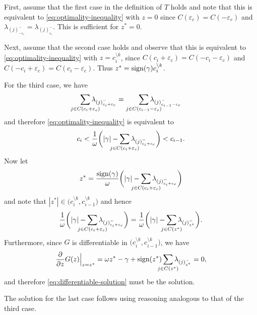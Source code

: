 First, assume that the first case in the definition of \(T\) holds
and note that this is equivalent to \eqref{eq:optimality-inequality} with \(z
= 0\) since \(C({\varepsilon_c}) = C(-{\varepsilon_c})\) and
\(\lambda_{(j)^-_{-{\varepsilon_c}}} = \lambda_{(j)^-_{{\varepsilon_c}}}\).
This is sufficient for \(z^* = 0\).

Next, assume that the second case holds and observe that this is equivalent
to \eqref{eq:optimality-inequality} with
\(z = c_i^{\setminus k}\), since
\(C(c_i + {\varepsilon_c}) = C(-c_i - {\varepsilon_c})\) and
\(C(-c_i + {\varepsilon_c}) = C(c_i - {\varepsilon_c})\). Thus \(z^* =
\operatorname{sign}(\gamma)c_i^{\setminus k}\).

For the third case, we have
\[
  \smashoperator{\sum_{j \in C(c_i + {\varepsilon_c})}} \lambda_{(j)^-_{c_i + {\varepsilon_c}}}
  =
  \smashoperator[r]{\sum_{j \in C(c_{i-1} - {\varepsilon_c})}} \lambda_{(j)^-_{c_{i-1} - {\varepsilon_c}}}
\]
and therefore \eqref{eq:optimality-inequality} is equivalent to
\[
  c_i < \frac{1}{\omega} \bigg( |\gamma| - \smashoperator{\sum_{j \in C(c_i + {\varepsilon_c})}} \lambda_{(j)^-_{c_i + {\varepsilon_c}}} \bigg) < c_{i -1}.
\]
Now let
\begin{equation}
  \label{eq:differentiable-solution}
  z^* = \frac{\sign(\gamma)}{\omega} \bigg( |\gamma| - \smashoperator{\sum_{j \in C(c_i + {\varepsilon_c})}} \lambda_{(j)^-_{c_i + {\varepsilon_c}}} \bigg)
\end{equation}
and note that \(|z^*| \in \big(c_i^{\setminus k}, c_{i-1}^{\setminus k}\big)\) and hence
\[
  \frac{1}{\omega} \bigg( |\gamma| - \smashoperator{\sum_{j \in C(c_i + {\varepsilon_c})}} \lambda_{(j)^-_{c_i + {\varepsilon_c}}} \bigg)
  =
  \frac{1}{\omega} \bigg( |\gamma| - \smashoperator{\sum_{j \in C(z^*)}} \lambda_{(j)^-_{z^*}} \bigg).
\]
Furthermore, since \(G\) is differentiable in \(\big(c_i^{\setminus k}, c_{i-1}^{\setminus k}\big)\), we have
\[
  \frac{\partial}{\partial z} G(z) \Big|_{z = z^*}
  = \omega z^* - \gamma + \sign(z^*) \smashoperator{\sum_{j \in C(z^*)}} \lambda_{(j)^-_{z^*}} = 0,
\]
and therefore \eqref{eq:differentiable-solution} must be the solution.

The solution for the last case follows using reasoning analogous to that of the
third case.

